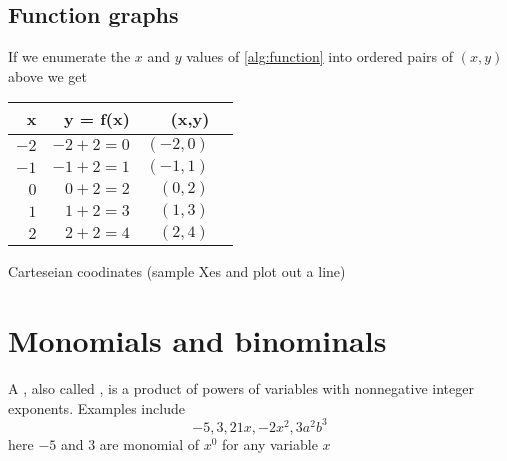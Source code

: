 \subsection{Function graphs}
If we enumerate the $x$ and $y$ values of \ref{alg:function} into ordered pairs of $(x, y)$ above we get
\begin{table}[H]
\centering
\begin{tabular}{|r|r|r|r|}
\hline
\textbf{x} & \textbf{y = f(x)} & \textbf{(x,y)} \\ \hline
$-2$       & $-2 + 2 =  0$     & $(-2,  0)$     \\ \hline
$-1$       & $-1 + 2 =  1$     & $(-1,  1)$     \\ \hline
$0$        & $ 0 + 2 =  2$     & $( 0,  2)$     \\ \hline
$1$        & $ 1 + 2 =  3$     & $( 1,  3)$     \\ \hline
$2$        & $ 2 + 2 =  4$     & $( 2,  4)$     \\ \hline
\end{tabular}
\end{table}

Carteseian coodinates (sample Xes and plot out a line)

\begin{figure}[H]
\centering
{}
\end{figure}


\section{Monomials and binominals}
A , also called , is a product of powers of variables with nonnegative integer exponents. Examples include
\[
-5, 3, 21x, -2x^2, 3a^2b^3
\]
here $-5$ and $3$ are monomial of $x^0$ for any variable $x$


